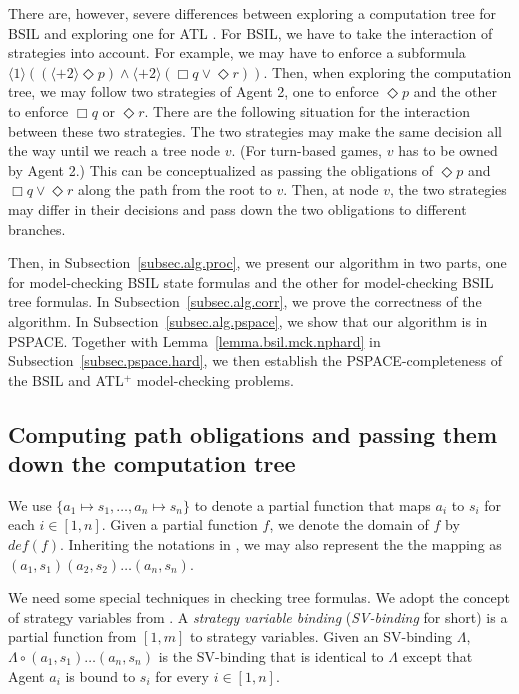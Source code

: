 \documentclass[11pt]{article}
\newcommand{\emdef}{\textit{def}}
\newcommand{\pfrr}{\Box}
\newcommand{\pevt}{\Diamond}
\begin{document}
There are, however, severe differences between exploring 
a computation tree for 
BSIL and exploring one for ATL \cite{AHK02}.   
For BSIL, we have to take the interaction of strategies into account.  
For example, we may have to enforce a subformula 
$\langle 1\rangle((\langle+ 2\rangle \pevt p)
\wedge\langle+ 2\rangle (\pfrr q\vee \pevt r))$.  
Then, when exploring the computation tree, 
we may follow two strategies of Agent 2, one to enforce $\pevt p$ and 
the other to enforce $\pfrr q$ or $\pevt r$.  
There are the following situation for the 
interaction between these two strategies. 
The two strategies may make the same decision all the way 
until we reach a tree node $v$.  
(For turn-based games, $v$ has to be owned by Agent 2.)    
This can be conceptualized as passing the obligations of $\pevt p$ and 
$\pfrr q\vee\pevt r$ along the path from the root to $v$.  
Then, at node $v$, the two strategies may differ in their decisions 
and pass down the two obligations to different branches. 

\label{reply2.exp.alg3} 
Then, in Subsection~\ref{subsec.alg.proc},
we present our algorithm in two parts,
one for model-checking BSIL state formulas
and the other for model-checking BSIL tree formulas.
In Subsection~\ref{subsec.alg.corr},
we prove the correctness of the algorithm.
In Subsection~\ref{subsec.alg.pspace}, 
we show that our algorithm is in PSPACE.  
Together with Lemma~\ref{lemma.bsil.mck.nphard} in 
Subsection~\ref{subsec.pspace.hard}, 
we then establish the PSPACE-completeness of 
the BSIL and ATL$^+$ model-checking problems.  



\subsection{Computing path obligations and passing them down the computation tree
\label{subsec.children.ltl.ob}
}

We use $\{a_1 \mapsto s_1,\ldots,a_n\mapsto s_n\}$ to denote 
a partial function that maps $a_i$ to $s_i$ for each $i\in[1,n]$.  
Given a partial function $f$, 
we denote the domain of $f$ by $\emdef(f)$.
Inheriting the notations in \cite{MMV10}, 
we may also represent the the mapping as $(a_1,s_1)(a_2,s_2)\ldots(a_n,s_n)$.  

We need some special techniques in checking tree formulas.  
We adopt the concept of strategy variables from \cite{CHP10,MMV10}. 
A {\em strategy variable binding} ({\em SV-binding} for short) 
is a partial function from $[1,m]$ to strategy variables.  
Given an SV-binding $\Lambda$, 
$\Lambda\circ(a_1, s_1)\ldots(a_n, s_n)$ 
is the SV-binding that is identical to $\Lambda$ 
except that Agent $a_i$ is bound to $s_i$ for every $i\in[1,n]$.  
\end{document}

